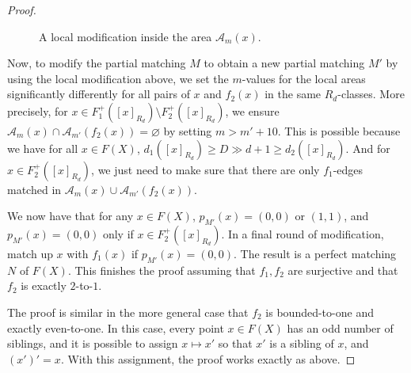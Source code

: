 \documentclass[11pt, reqno, a4paper]{amsart}
\theoremstyle{definition}
\theoremstyle{plain}
\begin{document}
\begin{proof}
\begin{figure}[H]
    \caption{A local modification inside the area $\mathcal A_m(x)$.}
    \label{Fig.8}
\end{figure}

Now, to modify the partial matching $M$ to obtain a new partial matching $M'$ by using the local modification above, we set
the $m$-values for the local areas significantly differently for all pairs of $x$ and $f_2(x)$ in the same $R_d$-classes. 
More precisely, for $x\in F_1^+([x]_{R_d})\setminus F_2^+([x]_{R_d})$, we ensure $\mathcal{A}_m(x)\cap \mathcal{A}_{m'}(f_2(x))=\varnothing$ by setting $m>m'+10$.  This is possible because we have for all $x\in F(X)$, $d_1([x]_{R_d})\geq D\gg d+1\geq d_2([x]_{R_d})$. And for $x\in F_2^+([x]_{R_d})$, we just need to make sure that there are only $f_1$-edges matched in $\mathcal{A}_m(x)\cup \mathcal{A}_{m'}(f_2(x))$.

We now have that for any $x\in F(X)$, $p_{M'}(x)=(0,0)$ or $(1,1)$, and $p_{M'}(x)=(0,0)$ only if $x\in F_2^+([x]_{R_d})$. In a final round of modification, match up $x$ with $f_1(x)$ if $p_{M'}(x)=(0,0)$. The result is a perfect matching $N$ of $F(X)$. This finishes the proof assuming that $f_1, f_2$ are surjective and that $f_2$ is exactly $2$-to-$1$.

The proof is similar in the more general case that $f_2$ is bounded-to-one and exactly even-to-one. In this case, every point $x\in F(X)$ has an odd number of siblings, and it is possible to assign $x\mapsto x'$ so that $x'$ is a sibling of $x$, and $(x')'=x$. With this assignment, the proof works exactly as above. 


\end{proof}
\end{document}

